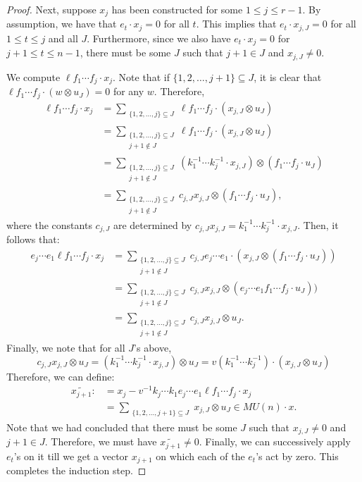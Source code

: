 \documentclass{amsart}
\numberwithin{equation}{section}
\theoremstyle{theorem}
\theoremstyle{definition}
\newcommand{\sub}{\subseteq}
\begin{document}
\begin{proof}
Next, suppose $x_{j}$ has been constructed for some $1\leq j\leq r-1$. By assumption, we have that $e_t\cdot x_j=0$ for all $t$. This implies that $e_t\cdot x_{j,J}=0$ for all $1\leq t\leq j$ and all $J$. Furthermore, since we also have $e_t\cdot x_j=0$ for $j+1\leq t\leq n-1$, there must be some $J$ such that $j+1\in J$ and $x_{j,J}\neq 0$.

We compute $\ell f_1\cdots f_j \cdot x_{j}$. Note that if $\{1,2,\dots, j+1\}\sub J$, it is clear that $\ell f_1\cdots f_{j} \cdot (w\otimes u_{J})=0$ for any $w$.
Therefore,
\begin{align*}
\ell f_1\cdots f_j \cdot x_j&=\sum_{\substack{\{1,2,\dots, j\}\sub J}} \ell f_1\cdots f_j \cdot(x_{j,J}\otimes u_J)\\
&=\sum_{\substack{\{1,2,\dots, j\}\sub J\\ j+1\not\in J}} \ell f_1\cdots f_j \cdot(x_{j,J}\otimes u_J)\\
&=\sum_{\substack{\{1,2,\dots, j\}\sub J\\ j+1\not\in J}}  (k_1^{-1}\cdots k_{j}^{-1}\cdot x_{j,J})\otimes (f_1\cdots f_j\cdot u_J)\\
&=\sum_{\substack{\{1,2,\dots, j\}\sub J\\ j+1\not\in J}}  c_{j,J} x_{j,J}\otimes (f_1\cdots f_j\cdot u_J),
\end{align*}
where the constants $c_{j,J}$ are determined by $c_{j,J}x_{j,J}=k_1^{-1}\cdots k_{j}^{-1}\cdot x_{j,J}$. Then, it follows that:
\begin{align*}
e_j\cdots e_1 \ell f_1\cdots f_j \cdot x_j&=\sum_{\substack{\{1,2,\dots, j\}\sub J\\ j+1\not\in J}}  c_{j,J} e_j\cdots e_1\cdot( x_{j,J}\otimes (f_1\cdots f_j\cdot u_J))\\
&=\sum_{\substack{\{1,2,\dots, j\}\sub J\\ j+1\not\in J}}  c_{j,J} x_{j,J}\otimes (e_j\cdots e_1 f_1\cdots f_j\cdot u_J))\\
&=\sum_{\substack{\{1,2,\dots, j\}\sub J\\ j+1\not\in J}}  c_{j,J} x_{j,J}\otimes u_J.
\end{align*}
Finally, we note that for all $J$'s above,
\[c_{j,J} x_{j,J}\otimes u_J = (k_1^{-1}\cdots k_{j}^{-1}\cdot x_{j,J})\otimes u_J = v(k_1^{-1}\cdots k_{j}^{-1})\cdot (x_{j,J}\otimes u_J)\]
Therefore, we can define:
\begin{align*}
\widetilde{x_{j+1}}:&=x_j - v^{-1} k_j\cdots k_{1} e_j\cdots e_1\ell f_1\cdots f_j \cdot x_j\\
&=\sum_{\substack{\{1,2,\dots, j+1\}\sub J}} x_{j,J}\otimes u_J \in MU(n)\cdot x.
\end{align*}
Note that we had concluded that there must be some $J$ such that $x_{j,J}\neq 0$ and $j+1\in J$. Therefore, we must have $\widetilde{x_{j+1}}\neq 0$. Finally, we can successively apply $e_t$'s on it till we get a vector $x_{j+1}$ on which each of the $e_t$'s act by zero. This completes the induction step.


\end{proof}
\end{document}
